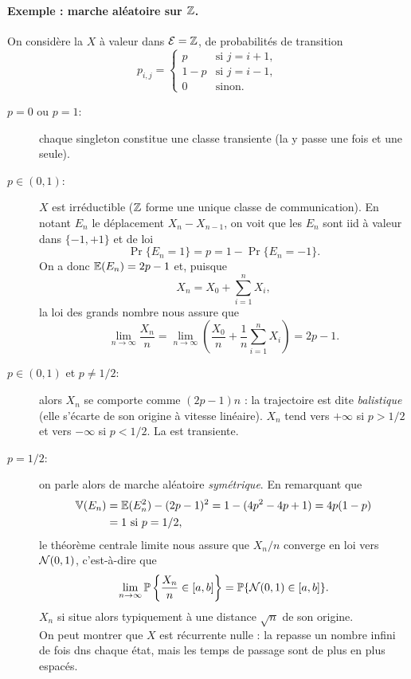 \paragraph{Exemple : marche aléatoire sur $\mathbb{Z}$.}
On considère la \cM $X$ à valeur dans $\mathcal{E} = \mathbb{Z}$, de probabilités de transition
$$
p_{i, j} = \left\{\begin{array}{rl}
                   p & \text{si } j = i+1, \\
                   1 - p & \text{si } j = i-1, \\
                   0 & \text{sinon.}
                  \end{array}\right.
$$
\begin{description}
  \item[$p = 0$ ou $p = 1$:] chaque singleton constitue une classe transiente (la \cM y passe une fois et une seule).
  \item[$p \in (0, 1)$:] $X$ est irréductible ($\mathbb{Z}$ forme une unique classe de communication). En notant $E_n$ le déplacement $X_n - X_{n-1}$, on voit que les $E_n$ sont iid à valeur dans $\{-1, +1\}$ et de loi
  $$
  \Pr\{E_n = 1\} = p = 1 - \Pr\{E_n = -1\}.
  $$
  On a donc $\operatorname{\mathbb{E}}(E_n) = 2p-1$ et, puisque
  $$
  X_n = X_0 + \sum_{i=1}^n X_i,
  $$
  la loi des grands nombre nous assure que 
  $$
  \lim_{n \rightarrow \infty} \frac{X_n}n = \lim_{n \rightarrow \infty} \left(\frac{X_0}n + \frac1n \sum_{i=1}^n X_i\right) = 2p - 1.
  $$
  \item[$p \in (0, 1)$ et $p \neq 1/2$:] alors $X_n$ se comporte comme $(2p-1)n$ : la trajectoire est dite {\em balistique} (elle s'écarte de son origine à vitesse linéaire). $X_n$ tend vers $+\infty$ si $p > 1/2$ et vers $-\infty$ si $p < 1/2$. La \cM est transiente.
  \item[$p = 1/2$:] on parle alors de marche aléatoire {\em symétrique}. En remarquant que 
  \begin{align*}
      \operatorname{\mathbb{V}}(E_n) & = \operatorname{\mathbb{E}}(E_n^2) - (2p - 1)^2 = 1 - (4p^2 - 4p + 1) = 4p(1-p) \\
      & = 1 \text{ si } p = 1/2,
  \end{align*}
  le théorème centrale limite nous assure que 
  $X_n/n$ converge en loi vers $\mathcal{N}(0, 1)$, c'est-à-dire que 
  $$
  \lim_{n \rightarrow \infty} \operatorname{\mathbb{P}}\left\{\frac{X_n}n \in [a, b]\right\} = \operatorname{\mathbb{P}}\{\mathcal{N}(0, 1) \in [a, b]\}.
  $$
  $X_n$ si situe alors typiquement à une distance $\sqrt{n}$ de son origine. \\
  On peut montrer que $X$ est récurrente nulle : la \cM repasse un nombre infini de fois dns chaque état, mais les temps de passage sont de plus en plus espacés.
\end{description}

